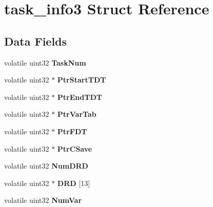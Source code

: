 \hypertarget{structtask__info3}{}\section{task\+\_\+info3 Struct Reference}
\label{structtask__info3}
\subsection*{Data Fields}
\begin{DoxyCompactItemize}
\item 
\mbox{\label{structtask__info3_acccc4697d1481d8ca6f5a96a73bd70f3}} 
volatile uint32 {\bfseries Task\+Num}
\item 
\mbox{\label{structtask__info3_af5c68a21082d3b7fbc066ca3b4a1a444}} 
volatile uint32 $\ast$ {\bfseries Ptr\+Start\+T\+DT}
\item 
\mbox{\label{structtask__info3_a3c8059300d806658576897577fba5d4d}} 
volatile uint32 $\ast$ {\bfseries Ptr\+End\+T\+DT}
\item 
\mbox{\label{structtask__info3_acabadaf167e6f88e89f3e3d517da3e23}} 
volatile uint32 $\ast$ {\bfseries Ptr\+Var\+Tab}
\item 
\mbox{\label{structtask__info3_af5c485e61e8fa9c3a29e0615490b82d5}} 
volatile uint32 $\ast$ {\bfseries Ptr\+F\+DT}
\item 
\mbox{\label{structtask__info3_a1d934e1c675856e96b24753fb9c037e3}} 
volatile uint32 $\ast$ {\bfseries Ptr\+C\+Save}
\item 
\mbox{\label{structtask__info3_a2b95917f50c0d965a6ac51f67a273afc}} 
volatile uint32 {\bfseries Num\+D\+RD}
\item 
\mbox{\label{structtask__info3_a77889ffa8a5ce47f5966365f39136106}} 
volatile uint32 $\ast$ {\bfseries D\+RD} \mbox{[}13\mbox{]}
\item 
\mbox{\label{structtask__info3_a15ffadc24684f293479c8d9dd27914bc}} 
volatile uint32 {\bfseries Num\+Var}
\item 

\end{DoxyCompactItemize}
